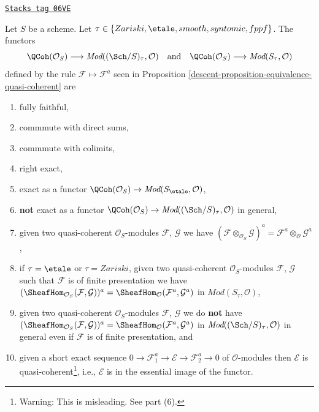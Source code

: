 \begin{lemma}
\label{descent-lemma-equivalence-quasi-coherent-limits}
\href{https://stacks.math.columbia.edu/tag/06VE}{\texttt{Stacks tag 06VE}}

Let $S$ be a scheme.
Let $\tau \in \{Zariski, \linebreak[0] \etale,
\linebreak[0] smooth, \linebreak[0] syntomic, \linebreak[0] fppf\}$.
The functors
$$
\QCoh(\mathcal{O}_S)
\longrightarrow
\textit{Mod}((\Sch/S)_\tau, \mathcal{O})
\quad\text{and}\quad
\QCoh(\mathcal{O}_S)
\longrightarrow
\textit{Mod}(S_\tau, \mathcal{O})
$$
defined by the rule $\mathcal{F} \mapsto \mathcal{F}^a$ seen in
Proposition \ref{descent-proposition-equivalence-quasi-coherent}
are
\begin{enumerate}
\item fully faithful,
\item commmute with direct sums,
\item commmute with colimits,
\item right exact,
\item exact as a functor
$\QCoh(\mathcal{O}_S) \to \textit{Mod}(S_\etale, \mathcal{O})$,
\item {\bf not} exact as a functor
$\QCoh(\mathcal{O}_S) \to
\textit{Mod}((\Sch/S)_\tau, \mathcal{O})$
in general,
\item given two quasi-coherent $\mathcal{O}_S$-modules
$\mathcal{F}$, $\mathcal{G}$ we have
$(\mathcal{F} \otimes_{\mathcal{O}_S} \mathcal{G})^a =
\mathcal{F}^a \otimes_\mathcal{O} \mathcal{G}^a$,
\item if $\tau = \etale$ or $\tau = Zariski$,
given two quasi-coherent $\mathcal{O}_S$-modules
$\mathcal{F}$, $\mathcal{G}$ such that $\mathcal{F}$
is of finite presentation we have
$(\SheafHom_{\mathcal{O}_S}(\mathcal{F}, \mathcal{G}))^a =
\SheafHom_\mathcal{O}(\mathcal{F}^a, \mathcal{G}^a)$ in
$\textit{Mod}(S_\tau, \mathcal{O})$,
\item given two quasi-coherent $\mathcal{O}_S$-modules
$\mathcal{F}$, $\mathcal{G}$ we do {\bf not} have
$(\SheafHom_{\mathcal{O}_S}(\mathcal{F}, \mathcal{G}))^a =
\SheafHom_\mathcal{O}(\mathcal{F}^a, \mathcal{G}^a)$
in $\textit{Mod}((\Sch/S)_\tau, \mathcal{O})$ in general
even if $\mathcal{F}$ is of finite presentation, and
\item given a short exact sequence
$0 \to \mathcal{F}_1^a \to \mathcal{E} \to \mathcal{F}_2^a \to 0$
of $\mathcal{O}$-modules then $\mathcal{E}$ is
quasi-coherent\footnote{Warning: This is misleading. See part (6).}, i.e.,
$\mathcal{E}$ is in the essential image of the functor.
\end{enumerate}
\end{lemma}

